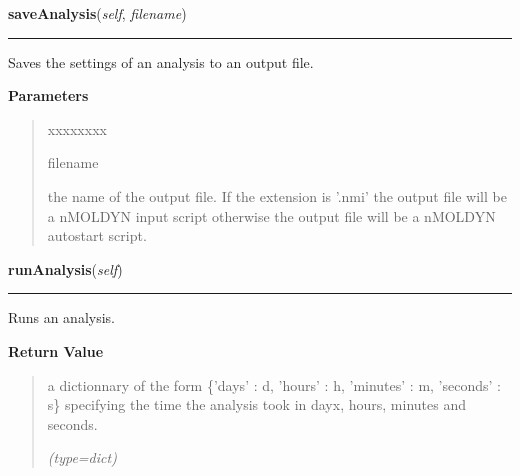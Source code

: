 \hspace{.8\funcindent}\begin{boxedminipage}{\funcwidth}

    \raggedright \textbf{saveAnalysis}(\textit{self}, \textit{filename})

    \vspace{-1.5ex}

    \rule{\textwidth}{0.5\fboxrule}
\setlength{\parskip}{2ex}
    Saves the settings of an analysis to an output file.

\setlength{\parskip}{1ex}
      \textbf{Parameters}
      \vspace{-1ex}

      \begin{quote}
        \begin{Ventry}{xxxxxxxx}

          \item[filename]

          the name of the output file. If the extension is '.nmi' the 
          output file will be a nMOLDYN input script otherwise the output 
          file will be a nMOLDYN autostart script.

        \end{Ventry}

      \end{quote}

    \end{boxedminipage}

    \label{nMOLDYN:Analysis:Analysis:Analysis:runAnalysis}

    \vspace{0.5ex}

\hspace{.8\funcindent}\begin{boxedminipage}{\funcwidth}

    \raggedright \textbf{runAnalysis}(\textit{self})

    \vspace{-1.5ex}

    \rule{\textwidth}{0.5\fboxrule}
\setlength{\parskip}{2ex}
    Runs an analysis.

\setlength{\parskip}{1ex}
      \textbf{Return Value}
    \vspace{-1ex}

      \begin{quote}
      a dictionnary of the form \{'days' : d, 'hours' : h, 'minutes' : m, 
      'seconds' : s\} specifying the time the analysis took in dayx, hours,
      minutes and seconds.

      {\it (type=dict)}

      \end{quote}

    \end{boxedminipage}


